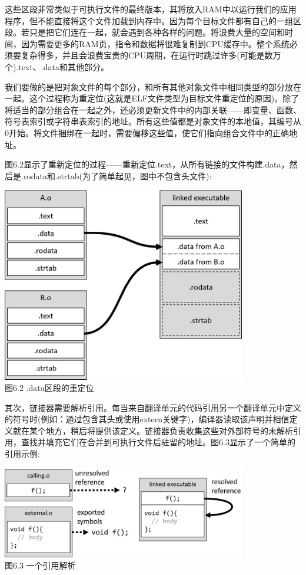 这些区段非常类似于可执行文件的最终版本，其将放入RAM中以运行我们的应用程序，但不能直接将这个文件加载到内存中。因为每个目标文件都有自己的一组区段。若只是把它们连在一起，就会遇到各种各样的问题。将浪费大量的空间和时间，因为需要更多的RAM页，指令和数据将很难复制到CPU缓存中。整个系统必须要复杂得多，并且会浪费宝贵的CPU周期，在运行时跳过许多(可能是数万个).text、.data和其他部分。

我们要做的是把对象文件的每个部分，和所有其他对象文件中相同类型的部分放在一起。这个过程称为重定位(这就是ELF文件类型为目标文件重定位的原因)。除了将适当的部分组合在一起之外，还必须更新文件中的内部关联——即变量、函数、符号表索引或字符串表索引的地址。所有这些值都是对象文件的本地值，其编号从0开始。将文件捆绑在一起时，需要偏移这些值，使它们指向组合文件中的正确地址。

图6.2显示了重新定位的过程——重新定位.text，从所有链接的文件构建.data，然后是.rodata和.strtab(为了简单起见，图中不包含头文件):

\begin{center}
\includegraphics[width=0.8\textwidth]{content/2/chapter6/images/2.jpg}\\
图6.2 .data区段的重定位
\end{center}

其次，链接器需要解析引用。每当来自翻译单元的代码引用另一个翻译单元中定义的符号时(例如：通过包含其头或使用extern关键字)，编译器读取该声明并相信定义就在某个地方，稍后将提供该定义。链接器负责收集这些对外部符号的未解析引用，查找并填充它们在合并到可执行文件后驻留的地址。图6.3显示了一个简单的引用示例:

\begin{center}
\includegraphics[width=0.8\textwidth]{content/2/chapter6/images/3.jpg}\\
图6.3 一个引用解析
\end{center}

